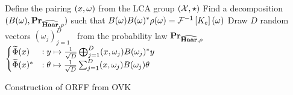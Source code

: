 \begin{center}
\begin{algorithm2e}[H]\label{alg:ORFF_construction}
	\SetAlgoLined
    \BlankLine
	Define the pairing $(x, \omega)$ from the \acs{LCA} group $(\mathcal{X}, \star)$\;
	Find a decomposition $(B(\omega),{\mathbf{{Pr}}}_{\widehat{\mathbf{Haar}},\rho})$ such that $B(\omega)B(\omega)^* \rho(\omega)=\mathcal{F}^{-1}\left[K_e\right](\omega)$\;
	Draw $D$ random vectors $(\omega_j)_{j=1}^D$ \iid~from the probability law ${\mathbf{{Pr}}}_{\widehat{\mathbf{Haar}},\rho}$\;
    \Return $\begin{cases}\widetilde{\Phi}(x) &:  y \mapsto \frac{1}{\sqrt{D}}\operatorname*{\bigoplus}_{j=1}^D(x, \omega_j)B(\omega_j)^* y \\ \widetilde{\Phi}(x)^* &: \theta \mapsto \frac{1}{\sqrt{D}} \sum_{j=1}^D (x, \omega_j)B(\omega_j)\theta \end{cases}$\;
   \caption{Construction of \acs{ORFF} from \acs{OVK}}
   \label{al:ORFF_construction}
\end{algorithm2e}
\end{center}


